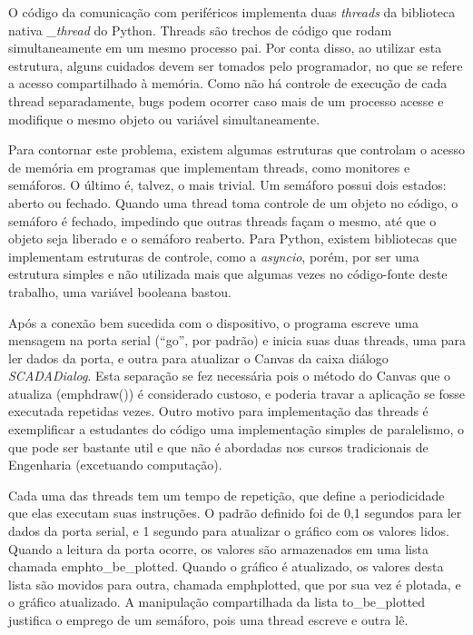 O código da comunicação com periféricos implementa duas \emph{threads} da biblioteca nativa \emph{\_thread} do Python. Threads são trechos de código que rodam simultaneamente em um mesmo processo pai. Por conta disso, ao utilizar esta estrutura, alguns cuidados devem ser tomados pelo programador, no que se refere a acesso compartilhado à memória. Como não há controle de execução de cada thread separadamente, bugs podem ocorrer caso mais de um processo acesse e modifique o mesmo objeto ou variável simultaneamente.

Para contornar este problema, existem algumas estruturas que controlam o acesso de memória em programas que implementam threads, como monitores e semáforos. O último é, talvez, o mais trivial. Um semáforo possui dois estados: aberto ou fechado. Quando uma thread toma controle de um objeto no código, o semáforo é fechado, impedindo que outras threads façam o mesmo, até que o objeto seja liberado e o semáforo reaberto. Para Python, existem bibliotecas que implementam estruturas de controle, como a \emph{asyncio}, porém, por ser uma estrutura simples e não utilizada mais que algumas vezes no código-fonte deste trabalho, uma variável booleana bastou.

Após a conexão bem sucedida com o dispositivo, o programa escreve uma mensagem na porta serial (“go”, por padrão) e inicia suas duas threads, uma para ler dados da porta, e outra para atualizar o Canvas da caixa diálogo \emph{SCADADialog}. Esta separação se fez necessária pois o método do Canvas que o atualiza (emph{draw()}) é considerado custoso, e poderia travar a aplicação se fosse executada repetidas vezes. Outro motivo para implementação das threads é exemplificar a estudantes do código uma implementação simples de paralelismo, o que pode ser bastante util e que não é abordadas nos cursos tradicionais de Engenharia (excetuando computação).

Cada uma das threads tem um tempo de repetição, que define a periodicidade que elas executam suas instruções. O padrão definido foi de 0,1 segundos para ler dados da porta serial, e 1 segundo para atualizar o gráfico com os valores lidos. Quando a leitura da porta ocorre, os valores são armazenados em uma lista chamada emph{to\_be\_plotted}. Quando o gráfico é atualizado, os valores desta lista são movidos para outra, chamada emph{plotted}, que por sua vez é plotada, e o gráfico atualizado. A manipulação compartilhada da lista to\_be\_plotted justifica o emprego de um semáforo, pois uma thread escreve e outra lê.

